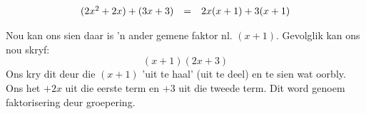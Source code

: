 \begin{equation*}
\begin{array}{ccl}
(2{x}^{2}+2x)+(3x+3) &=& 2x(x+1)+3(x+1) \hfill \hfill
\end{array}
\end{equation*}


Nou kan ons sien daar is ’n ander gemene faktor nl. $(x+1)$. Gevolglik kan ons nou skryf: 
\begin{equation*}
(x+1)(2x+3)
\end{equation*}
Ons kry dit deur die $(x+1)$ ’uit te haal’ (uit te deel) en te sien wat oorbly. Ons het $+2x$ uit die eerste term en $+3$ uit die tweede term. Dit word genoem faktorisering deur groepering.\par 



